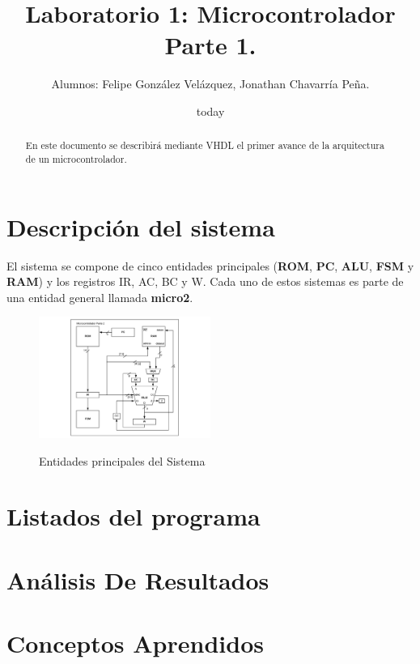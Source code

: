 \documentclass[12pt,letterpapers]{IEEEtran}
\date{today}
\title{Laboratorio 1: Microcontrolador Parte 1.}
\author{Alumnos: Felipe González Velázquez, Jonathan Chavarría Peña.}
\begin{document}
\renewcommand{\leftmark}{UNIVERSIDAD LATINA DE COSTA RICA -- BINGE-57 Arquitectura de Computadores}
\maketitle
	\begin{abstract}
	En este documento se describirá mediante VHDL el primer avance de la arquitectura de un microcontrolador.  
	\end{abstract}
\section{Descripción del sistema}
El sistema se compone de cinco entidades principales (\textbf{ROM}, \textbf{PC}, \textbf{ALU}, \textbf {FSM} y \textbf{RAM}) y los registros IR, AC, BC y W. Cada uno de estos sistemas es parte de una entidad general llamada \textbf{micro2}.

	\begin{figure}[H]
		\centering	
		\includegraphics[width=0.5\textwidth]{graph} 
		\label{graph}
		\caption{Entidades principales del Sistema}
	\end{figure} 

\section{Listados del programa}

\section{Análisis De Resultados}

\section{Conceptos Aprendidos}  
\end{document}
